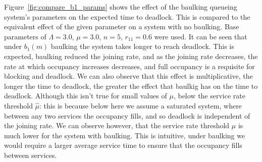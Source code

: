 \documentclass{article}
\begin{document}
Figure~\ref{fig:compare_b1_params} shows the effect of the baulking queueing system's parameters on the expected time to deadlock.
This is compared to the equivalent effect of the given parameter on a system with no baulking.
Base parameters of $\Lambda = 3.0$, $\mu = 3.0$, $n = 5$, $r_{11} = 0.6$ were used.
It can be seen that under $b_1(m)$ baulking the system takes longer to reach deadlock.
This is expected, baulking reduced the joining rate, and as the joining rate decreases, the rate at which occupancy increases decreases, and full occupancy is a requisite for blocking and deadlock.
We can also observe that this effect is multiplicative, the longer the time to deadlock, the greater the effect that baulkig has on the time to deadlock.
Although this isn't true for small values of $\mu$, below the service rate threshold $\hat{\mu}$: this is because below here we assume a saturated system, where between any two services the occupancy fills, and so deadlock is independent of the joining rate.
We can observe however, that the service rate threshold $\hat{\mu}$ is much lower for the system with baulking.
This is intuitive, under baulking we would require a larger average service time to ensure that the occupancy fills between services.
\end{document}
